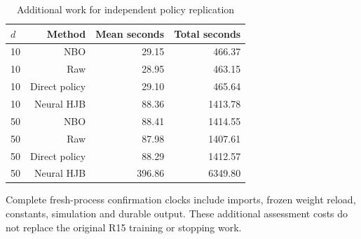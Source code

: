 \begin{table}[!htbp]
\centering\small
\caption{Additional work for independent policy replication}
\label{tab:r16-replication-work}
\begin{tabular}{lrrr}
\toprule
$d$ & Method & Mean seconds & Total seconds \\
\midrule
10 & NBO & 29.15 & 466.37 \\
10 & Raw & 28.95 & 463.15 \\
10 & Direct policy & 29.10 & 465.64 \\
10 & Neural HJB & 88.36 & 1413.78 \\
50 & NBO & 88.41 & 1414.55 \\
50 & Raw & 87.98 & 1407.61 \\
50 & Direct policy & 88.29 & 1412.57 \\
50 & Neural HJB & 396.86 & 6349.80 \\
\bottomrule
\end{tabular}
\par\medskip\noindent\footnotesize Complete fresh-process confirmation clocks include imports, frozen weight reload, constants, simulation and durable output. These additional assessment costs do not replace the original R15 training or stopping work.
\end{table}
